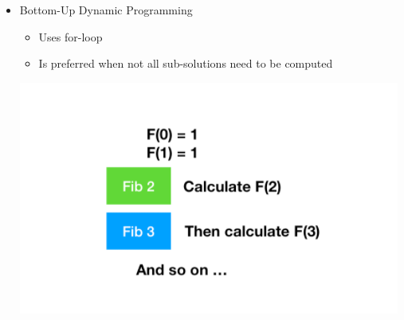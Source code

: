 \documentclass[12pt]{article}
\begin{document}
\begin{enumerate}[1.]
\begin{itemize}
        \item Bottom-Up Dynamic Programming
        \begin{itemize}
            \item Uses for-loop
            \item Is preferred when not all sub-solutions need to be computed
        \end{itemize}

        \begin{center}
        \includegraphics[width=0.7\linewidth]{images/worksheet_3_solution_9.png}
        \end{center}
    \end{itemize}
\end{enumerate}
\end{document}
